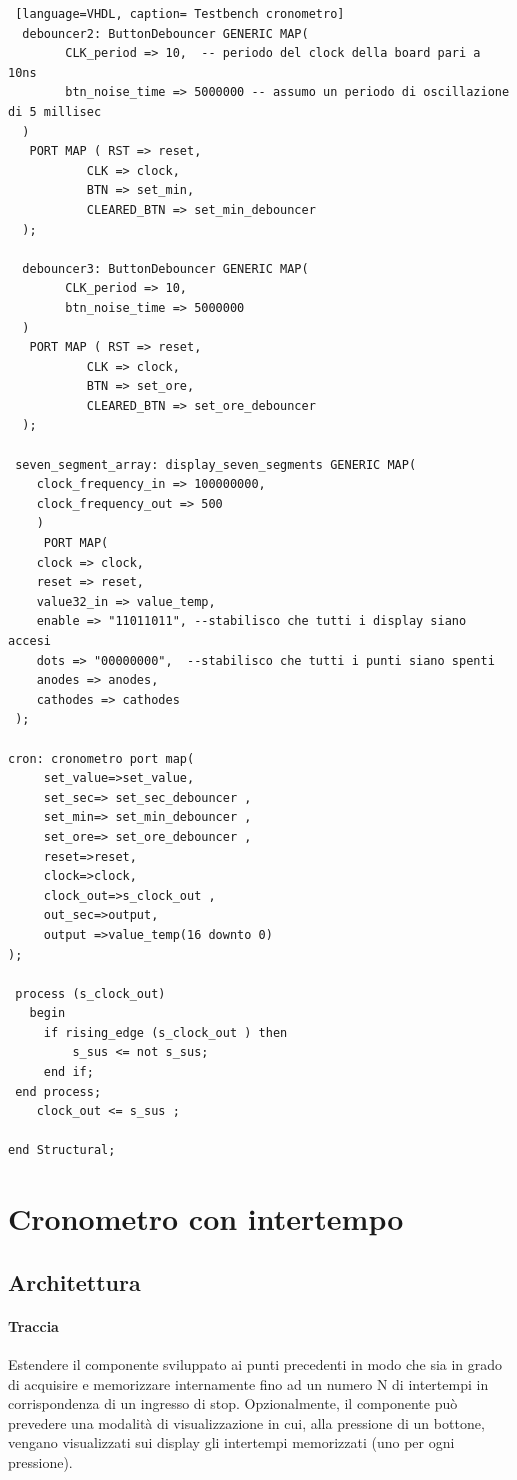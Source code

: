 \begin{lstlisting} [language=VHDL, caption= Testbench cronometro]
  debouncer2: ButtonDebouncer GENERIC MAP( 
        CLK_period => 10,  -- periodo del clock della board pari a 10ns
        btn_noise_time => 5000000 -- assumo un periodo di oscillazione di 5 millisec
  )
   PORT MAP ( RST => reset,
           CLK => clock, 
           BTN => set_min,
           CLEARED_BTN => set_min_debouncer
  );

  debouncer3: ButtonDebouncer GENERIC MAP( 
        CLK_period => 10,  
        btn_noise_time => 5000000
  )
   PORT MAP ( RST => reset,
           CLK => clock, 
           BTN => set_ore,
           CLEARED_BTN => set_ore_debouncer                                     
  );

 seven_segment_array: display_seven_segments GENERIC MAP(
	clock_frequency_in => 100000000,
	clock_frequency_out => 500
	)
     PORT MAP(
	clock => clock,
	reset => reset,
	value32_in => value_temp,
	enable => "11011011", --stabilisco che tutti i display siano accesi 
	dots => "00000000",  --stabilisco che tutti i punti siano spenti
	anodes => anodes,
	cathodes => cathodes
 );

cron: cronometro port map(
     set_value=>set_value,
     set_sec=> set_sec_debouncer ,
     set_min=> set_min_debouncer ,
     set_ore=> set_ore_debouncer ,
     reset=>reset,
     clock=>clock,
     clock_out=>s_clock_out ,
     out_sec=>output,
     output =>value_temp(16 downto 0)
);

 process (s_clock_out)
   begin
     if rising_edge (s_clock_out ) then
         s_sus <= not s_sus;
     end if;
 end process;
    clock_out <= s_sus ;
   
end Structural;
\end{lstlisting}

\section{Cronometro con intertempo}

\subsection{Architettura}
\paragraph{Traccia} 
Estendere il componente sviluppato ai punti precedenti in modo che sia in grado di acquisire e memorizzare internamente fino ad un numero N di intertempi in corrispondenza di un ingresso di stop. Opzionalmente, il componente può prevedere una modalità di visualizzazione in cui, alla  pressione di un bottone, vengano visualizzati sui display gli intertempi memorizzati (uno per ogni pressione).

